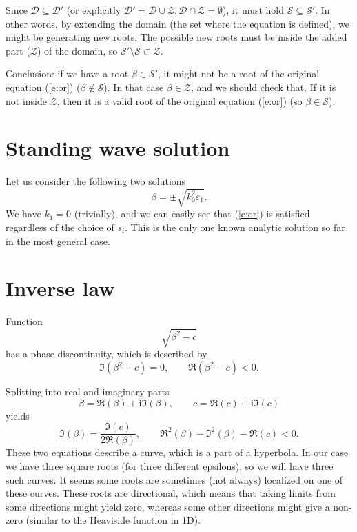 \documentclass[12pt]{article}
\newcommand{\rf}[1]{(\ref{#1})}
\newcommand{\cu}{\mathrm{i}}
\newcommand{\eps}{\varepsilon}
\begin{document}
Since $\mathcal{D} \subseteq \mathcal{D}'$ (or explicitly $\mathcal{D}' = \mathcal{D} \cup \mathcal{Z}, \mathcal{D} \cap \mathcal{Z} = \emptyset $), it must hold $\mathcal{S}\subseteq\mathcal{S}'$. In other words, by extending the domain (the set where the equation is defined), we might be generating new roots. The possible new roots must be inside the added part ($\mathcal{Z}$) of the domain, so $\mathcal{S}'\setminus \mathcal{S} \subset \mathcal{Z}$.

Conclusion: if we have a root  $\beta \in \mathcal{S}'$, it might not be a root of the original equation \rf{e:or} ($\beta \notin \mathcal{S}$). In that case $\beta \in \mathcal{Z}$, and we should check that. If it is not inside $\mathcal{Z}$, then it is a valid root of the original equation \rf{e:or} (so $\beta \in \mathcal{S}$).

\section{Standing wave solution}
Let us consider the following two solutions
\begin{equation}
\beta = \pm\sqrt{k_0^2\eps_1}.
\end{equation}
We have $k_1=0$ (trivially), and we can easily see that \rf{e:or} is satisfied regardless of the choice of $s_i$. This is the only one known analytic solution so far in the most general case.
\section{Inverse law}
Function
\begin{equation}
\sqrt{\beta^2 - c}
\end{equation}
has a phase discontinuity, which is described by
\begin{equation}
\Im(\beta^2 - c) = 0,\qquad \Re(\beta^2 - c) < 0.
\end{equation}

Splitting into real and imaginary parts
\begin{equation}
\beta = \Re(\beta) + \cu\Im(\beta),\qquad c = \Re(c) + \cu\Im(c) 
\end{equation}
yields
\begin{equation}
\Im(\beta) = \frac{\Im(c)}{2\Re(\beta)},\qquad \Re^2(\beta)-\Im^2(\beta) - \Re(c) < 0.
\end{equation}
These two equations describe a curve, which is a part of a hyperbola. In our case we have three square roots (for three different epsilons), so we will have three such curves. It seems some roots are sometimes (not always) localized on one of these curves. These roots are directional, which means that taking limits from some directions might yield zero, whereas some other directions might give a non-zero (similar to the Heaviside function in 1D).
\end{document}
